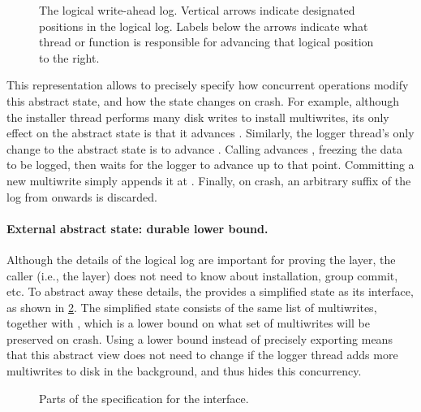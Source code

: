 \begin{figure}[ht]
    
    \vspace{-\baselineskip}
    \caption{The logical write-ahead log.  Vertical arrows indicate
        designated positions in the logical log.  Labels below the arrows
        indicate what thread or function is responsible for advancing
        that logical position to the right.}
    \label{fig:log}
\end{figure}

This representation allows \txn to precisely specify how concurrent
operations modify this abstract state, and how the state changes on crash.
For example, although the installer thread performs many disk writes to
install multiwrites, its only effect on the abstract state is that it
advances .  Similarly, the logger thread's only change to
the abstract state is to advance .  Calling 
advances , freezing the data to be logged, then waits
for the logger to advance  up to that point.  Committing a
new multiwrite simply appends it at .  Finally, on crash,
an arbitrary suffix of the log from  onwards is discarded.


\paragraph{External abstract state: durable lower bound.}
Although the details of the logical log are important for proving the
 layer, the caller (i.e., the  layer) does not need
to know about installation, group commit, etc. To abstract away these
details, the  provides a simplified state as its interface,
as shown in \cref{fig:wal-spec}.  The simplified state consists of
the same list of multiwrites, together with , which is
a lower bound on what set of multiwrites will be preserved on crash.
Using a lower bound instead of precisely exporting  means
that this abstract view does not need to change if the logger thread
adds more multiwrites to disk in the background, and thus hides
this concurrency.

\begin{figure}[ht]

\vspace{-\baselineskip}
\caption{Parts of the specification for the  interface.}
\label{fig:wal-spec}
\end{figure}



